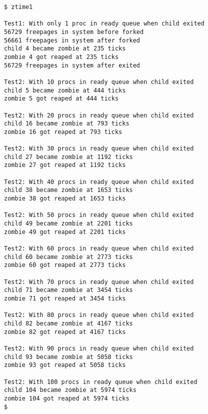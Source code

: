 \documentclass[varwidth,crop]{standalone}
\begin{document}
\begin{verbatim}
$ ztime1

Test1: With only 1 proc in ready queue when child exited
56729 freepages in system before forked 
56661 freepages in system after forked
child 4 became zombie at 235 ticks
zombie 4 got reaped at 235 ticks
56729 freepages in system after exited

Test2: With 10 procs in ready queue when child exited
child 5 became zombie at 444 ticks
zombie 5 got reaped at 444 ticks

Test2: With 20 procs in ready queue when child exited
child 16 became zombie at 793 ticks
zombie 16 got reaped at 793 ticks

Test2: With 30 procs in ready queue when child exited
child 27 became zombie at 1192 ticks
zombie 27 got reaped at 1192 ticks

Test2: With 40 procs in ready queue when child exited
child 38 became zombie at 1653 ticks
zombie 38 got reaped at 1653 ticks

Test2: With 50 procs in ready queue when child exited
child 49 became zombie at 2201 ticks
zombie 49 got reaped at 2201 ticks

Test2: With 60 procs in ready queue when child exited
child 60 became zombie at 2773 ticks
zombie 60 got reaped at 2773 ticks

Test2: With 70 procs in ready queue when child exited
child 71 became zombie at 3454 ticks
zombie 71 got reaped at 3454 ticks

Test2: With 80 procs in ready queue when child exited
child 82 became zombie at 4167 ticks
zombie 82 got reaped at 4167 ticks

Test2: With 90 procs in ready queue when child exited
child 93 became zombie at 5058 ticks
zombie 93 got reaped at 5058 ticks

Test2: With 100 procs in ready queue when child exited
child 104 became zombie at 5974 ticks
zombie 104 got reaped at 5974 ticks
$ 
\end{verbatim}
\end{document}
